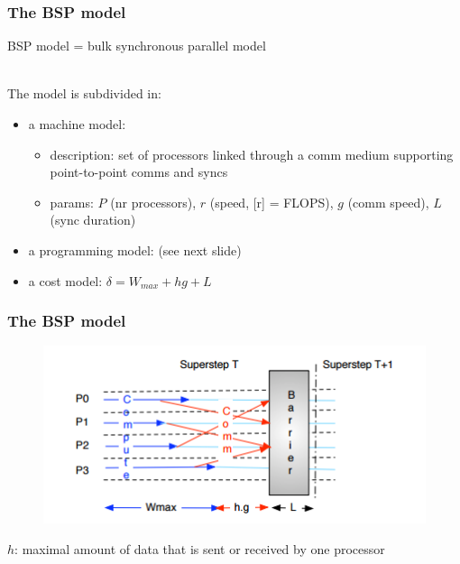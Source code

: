 \documentclass{beamer}
\begin{document}
\begin{frame}
\frametitle{The BSP model}

BSP model = bulk synchronous parallel model

\ \\


The model is subdivided in:

\begin{itemize}

\item a machine model: 
\begin{itemize}
\item description: set of processors linked through a comm medium supporting point-to-point comms and syncs
\item params: $P$ (nr processors), $r$ (speed, [r] = FLOPS), $g$ (comm speed), $L$ (sync duration)
\end{itemize}
\item a programming model: (see next slide)
\item a cost model: $\delta = W_{max} + hg + L$

\end{itemize}

\end{frame}

\begin{frame}
\frametitle{The BSP model}

\begin{figure}
\includegraphics[width=0.8\linewidth]{bsp-description.png}
\end{figure}

$h$: maximal amount of data that is sent or received by one processor

\end{frame}
\end{document}

